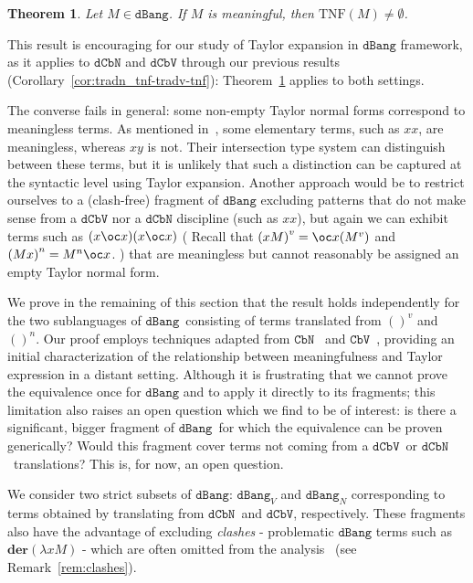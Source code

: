 \documentclass[10pt,a4paper]{article}
\newtheorem{theorem}{Theorem}
\newcommand{\<}{\langle}
\renewcommand{\>}{\rangle}
\newcommand{\der}[1]{\ensuremath{\mathbf{der}(#1)}}
\newcommand{\dcbn}{\ensuremath{\mathtt{dCbN}}}
\newcommand{\cbn}{\ensuremath{\mathtt{CbN}}}
\newcommand{\dcbv}{\ensuremath{\mathtt{dCbV}}}
\newcommand{\cbv}{\ensuremath{\mathtt{CbV}}}
\newcommand{\dbang}{\ensuremath{\mathtt{dBang}}}
\newcommand{\dbangv}{\ensuremath{\dbang_V}}
\newcommand{\dbangn}{\ensuremath{\dbang_N}}
\newcommand{\tradv}[1]{\ensuremath{{#1}^v}}
\newcommand{\tradn}[1]{\ensuremath{{#1}^n}}
\newcommand{\taylornf}[1]{\ensuremath{\text{TNF}(#1)}}
\begin{document}
\begin{theorem}\label{thm:tnf-dbang}
	Let $M\in\dbang$. If $M$ is meaningful, then $\taylornf{M}\neq
	\emptyset$.
\end{theorem}


This result is encouraging for our study of Taylor expansion in $\dbang$
framework, as it applies to $\dcbn$ and $\dcbv$ through our previous 
results (Corollary~\ref{cor:tradn_tnf-tradv-tnf}): 
Theorem~\ref{thm:tnf-dbang} applies to both settings.

The converse fails in general: some non-empty Taylor normal forms correspond to
meaningless terms. As mentioned in~\cite{kag24}, some elementary terms, such as
$xx$, are meaningless, whereas $xy$ is not. Their intersection type system can
distinguish between these terms, but it is unlikely that such a distinction can
be captured at the syntactic level using Taylor expansion. 
%
Another approach would be to restrict ourselves to a (clash-free) fragment of
$\dbang$ excluding patterns that do not make sense from a $\dcbv$ nor a $\dcbn$
discipline (such as $xx$), but again we can exhibit terms such as $(x\oc x)(x\oc
x)$ (
	Recall that $\tradv{(xM)}=\oc x(\tradv M)$ and $\tradn{(Mx)}=\tradn M
	\oc x$.
) that are meaningless but cannot reasonably be assigned an empty Taylor normal
form. 

We prove in the remaining of this section that the result holds independently
for the two sublanguages of \dbang\ consisting of terms translated from
$\tradv{()}$ and $\tradn{()}$.
%
Our proof employs techniques adapted from \cbn{}~\cite{ER08} and
\cbv~\cite{CG14}, providing an initial characterization of the relationship between meaningfulness and Taylor
expression in a distant setting. Although it is frustrating that we cannot prove
the equivalence once for $\dbang$ and to apply it directly to its fragments;
this limitation 
also raises an open question which we find to be of interest: is there a
significant, bigger fragment of \dbang\ for which the equivalence can be proven
generically? Would this fragment cover terms not coming from a \dcbv\ or \dcbn\
translations? This is, for now, an open question.

We consider two strict subsets of \dbang : $\dbangv$ and $\dbangn$ corresponding
to terms obtained by translating from \dcbn\ and \dcbv, respectively. These
fragments also have the advantage of excluding 
\emph{clashes} - problematic $\dbang$ terms such as $\der{\lambda xM}$ - 
which are often omitted from the analysis~\cite{bucciarelli2023bang,
ehrhard2016bang} (see Remark~\ref{rem:clashes}).
\end{document}
